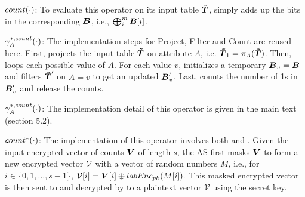  $count(\cdot)$: To evaluate this operator on its input table $\boldsymbol{\tilde{T}}$, \system simply  adds up the bits in the corresponding $\boldsymbol{B}$, i.e., $\bigoplus_{i}^m \boldsymbol{B}[i]$.


 $\gamma^{*,count}_{A}(\cdot)$: The implementation steps for \textsf{Project}, \textsf{Filter} and \textsf{Count} are reused here. First, \system projects the input table $\boldsymbol{\tilde{T}}$ on attribute $A$, i.e. $\boldsymbol{\tilde{T}}_1 = \pi_A(\boldsymbol{\tilde{T}})$. Then, \system loops each possible value of $A$. For each value $v$, \system initializes a temporary $\boldsymbol{B}_v=\boldsymbol{B}$ and filters $\boldsymbol{\tilde{T}}'$ on $A=v$ to get an updated $\boldsymbol{B}'_v$. Last, \system counts the number of 1s in $\boldsymbol{B}'_v$ and release the counts.


 $\gamma^{*,count}_A(\cdot)$: The implementation detail of this operator is given in the main text (section 5.2).

  $count^*(\cdot)$: The implementation of this operator involves both \AS and \CPS. Given the input encrypted vector of counts $\boldsymbol{V}$ of length $s$, the AS first masks $\boldsymbol{V}$ to form a new encrypted vector ${\bf \mathcal{V}}$ with a vector of random numbers $M$, i.e., for $i\in \{0,1,\ldots, s-1\}$,
${\bf \mathcal{V}}[i] = {\boldsymbol{V}}[i] \oplus labEnc_{pk}(M[i]).$
This masked encrypted vector is then sent to \CPS and decrypted by \CPS to a plaintext vector $\mathcal{V}$ using the secret key.


